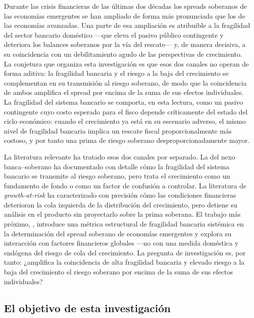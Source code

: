 Durante las crisis financieras de las últimas dos décadas los spreads soberanos de las economías emergentes se han ampliado de forma más pronunciada que los de las economías avanzadas. Una parte de esa ampliación es atribuible a la fragilidad del sector bancario doméstico —que eleva el pasivo público contingente y deteriora los balances soberanos por la vía del rescate— y, de manera decisiva, a su coincidencia con un debilitamiento agudo de las perspectivas de crecimiento. La conjetura que organiza esta investigación es que esos dos canales no operan de forma aditiva: la fragilidad bancaria y el riesgo a la baja del crecimiento se complementan en su transmisión al riesgo soberano, de modo que la coincidencia de ambos amplifica el spread por encima de la suma de sus efectos individuales. La fragilidad del sistema bancario se comporta, en esta lectura, como un pasivo contingente cuyo costo esperado para el fisco depende críticamente del estado del ciclo económico: cuando el crecimiento ya está en su escenario adverso, el mismo nivel de fragilidad bancaria implica un rescate fiscal proporcionalmente más costoso, y por tanto una prima de riesgo soberano desproporcionadamente mayor.

La literatura relevante ha tratado esos dos canales por separado. La del nexo banca--soberano ha documentado con detalle cómo la fragilidad del sistema bancario se transmite al riesgo soberano, pero trata el crecimiento como un fundamento de fondo o como un factor de confusión a controlar. La literatura de \textit{growth-at-risk} ha caracterizado con precisión cómo las condiciones financieras deterioran la cola izquierda de la distribución del crecimiento, pero detiene su análisis en el producto sin proyectarlo sobre la prima soberana. El trabajo más próximo, \citet{Chari2024b}, introduce una métrica estructural de fragilidad bancaria sistémica en la determinación del spread soberano de economías emergentes y explora su interacción con factores financieros globales —no con una medida doméstica y endógena del riesgo de cola del crecimiento. La pregunta de investigación es, por tanto: ¿amplifica la coincidencia de alta fragilidad bancaria y elevado riesgo a la baja del crecimiento el riesgo soberano por encima de la suma de sus efectos individuales?

\subsection{El objetivo de esta investigación}

